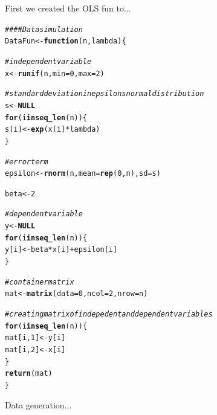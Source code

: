 \documentclass{article}\usepackage[]{graphicx}\usepackage[]{color}
\makeatletter
\newcommand{\hlnum}[1]{\textcolor[rgb]{0.686,0.059,0.569}{#1}}%
\newcommand{\hlcom}[1]{\textcolor[rgb]{0.678,0.584,0.686}{\textit{#1}}}%
\newcommand{\hlopt}[1]{\textcolor[rgb]{0,0,0}{#1}}%
\newcommand{\hlstd}[1]{\textcolor[rgb]{0.345,0.345,0.345}{#1}}%
\newcommand{\hlkwa}[1]{\textcolor[rgb]{0.161,0.373,0.58}{\textbf{#1}}}%
\newcommand{\hlkwb}[1]{\textcolor[rgb]{0.69,0.353,0.396}{#1}}%
\newcommand{\hlkwc}[1]{\textcolor[rgb]{0.333,0.667,0.333}{#1}}%
\newcommand{\hlkwd}[1]{\textcolor[rgb]{0.737,0.353,0.396}{\textbf{#1}}}%
\newenvironment{kframe}{%
 \def\at@end@of@kframe{}%
 \ifinner\ifhmode%
  \def\at@end@of@kframe{\end{minipage}}%
  \begin{minipage}{\columnwidth}%
 \fi\fi%
 \def\FrameCommand##1{\hskip\@totalleftmargin \hskip-\fboxsep
 \colorbox{shadecolor}{##1}\hskip-\fboxsep
     \hskip-\linewidth \hskip-\@totalleftmargin \hskip\columnwidth}%
 \MakeFramed {\advance\hsize-\width
   \@totalleftmargin\z@ \linewidth\hsize
   \@setminipage}}%
 {\par\unskip\endMakeFramed%
 \at@end@of@kframe}
\newenvironment{knitrout}{}{} %
\makeatother
\begin{document}
First we created the OLS fun to...

\begin{knitrout}
\color{fgcolor}\begin{kframe}
\begin{alltt}
\hlcom{#### Data simulation}
\hlstd{DataFun} \hlkwb{<-} \hlkwa{function}\hlstd{(}\hlkwc{n}\hlstd{,} \hlkwc{lambda}\hlstd{) \{}

    \hlcom{# independent variable}
    \hlstd{x} \hlkwb{<-} \hlkwd{runif}\hlstd{(n,} \hlkwc{min} \hlstd{=} \hlnum{0}\hlstd{,} \hlkwc{max} \hlstd{=} \hlnum{2}\hlstd{)}

    \hlcom{# standard deviation in epsilons normal distribution}
    \hlstd{s} \hlkwb{<-} \hlkwa{NULL}
    \hlkwa{for} \hlstd{(i} \hlkwa{in} \hlkwd{seq_len}\hlstd{(n)) \{}
        \hlstd{s[i]} \hlkwb{<-} \hlkwd{exp}\hlstd{(x[i]}\hlopt{*}\hlstd{lambda)}
    \hlstd{\}}

    \hlcom{# error term}
    \hlstd{epsilon} \hlkwb{<-} \hlkwd{rnorm}\hlstd{(n,} \hlkwc{mean} \hlstd{=} \hlkwd{rep}\hlstd{(}\hlnum{0}\hlstd{, n),} \hlkwc{sd} \hlstd{= s)}

    \hlstd{beta} \hlkwb{<-} \hlnum{2}

    \hlcom{# dependent variable}
    \hlstd{y} \hlkwb{<-} \hlkwa{NULL}
    \hlkwa{for} \hlstd{(i} \hlkwa{in} \hlkwd{seq_len}\hlstd{(n)) \{}
        \hlstd{y[i]} \hlkwb{<-} \hlstd{beta}\hlopt{*}\hlstd{x[i]} \hlopt{+} \hlstd{epsilon[i]}
    \hlstd{\}}

    \hlcom{# container matrix}
    \hlstd{mat} \hlkwb{<-} \hlkwd{matrix}\hlstd{(}\hlkwc{data} \hlstd{=} \hlnum{0}\hlstd{,} \hlkwc{ncol} \hlstd{=} \hlnum{2}\hlstd{,} \hlkwc{nrow} \hlstd{= n)}

    \hlcom{# creating matrix of indepedent and dependent variables}
    \hlkwa{for} \hlstd{(i} \hlkwa{in} \hlkwd{seq_len}\hlstd{(n)) \{}
        \hlstd{mat[i,} \hlnum{1}\hlstd{]} \hlkwb{<-} \hlstd{y[i]}
        \hlstd{mat[i,} \hlnum{2}\hlstd{]} \hlkwb{<-} \hlstd{x[i]}
    \hlstd{\}}
    \hlkwd{return}\hlstd{(mat)}
\hlstd{\}}
\end{alltt}
\end{kframe}
\end{knitrout}

Data generation...
\end{document}
